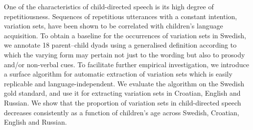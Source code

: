 One of the characteristics of child-directed speech is its high degree of repetitiousness. Sequences of repetitious utterances with a constant intention, variation sets, have been shown to be correlated with children's language acquisition. To obtain a baseline for the occurrences of variation sets in Swedish, we annotate 18 parent--child dyads using a generalised definition according to which the varying form may pertain not just to the wording but also to prosody and/or non-verbal cues. To facilitate further empirical investigation, we introduce a surface algorithm for automatic extraction of variation sets which is easily replicable and language-independent. We evaluate the algorithm on the Swedish gold standard, and use it for extracting variation sets in Croatian, English and Russian. We show that the proportion of variation sets in child-directed speech decreases consistently as a function of children's age across Swedish, Croatian, English and Russian.

